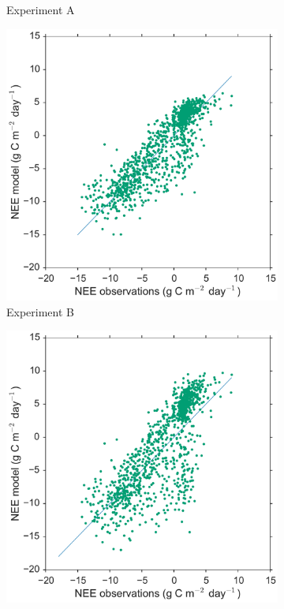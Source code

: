 \documentclass[review]{elsarticle}
\begin{document}
\begin{figure}
\begin{subfigure}[b]{0.4\textwidth}
        \caption{Experiment A}
        \label{fig:forecastscatBR}
    \end{subfigure}
    \begin{subfigure}[b]{0.4\textwidth}
        \includegraphics[width=\textwidth]{Bfscat2.pdf}
        \caption{Experiment B}
        \label{fig:forecastscatedcBR}
    \end{subfigure}
    \begin{subfigure}[b]{0.4\textwidth}
        \includegraphics[width=\textwidth]{Cfscat2.pdf}

\end{subfigure}
\end{figure}
\end{document}
